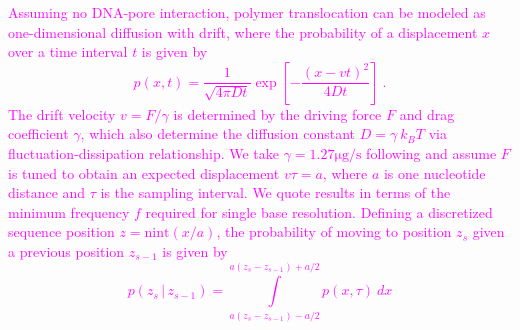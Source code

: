 \documentclass{biophys_letter}
\newcommand{\bias}{\beta}
\newcommand{\jwm}[1]{\textcolor{Magenta}{#1}}
\begin{document}
\begin{multicols}{2}
\jwm{
Assuming no DNA-pore interaction, polymer translocation can be modeled as one-dimensional diffusion with drift, where the probability of a displacement $x$ over a time interval $t$ is given by
\begin{equation}
  p(x, t) 
  =  
  \frac{1}
       {\sqrt{4 \pi D t}}
  \exp 
  \left[ 
    - \frac{(x - v t)^2}
           {4 D t} 
  \right]
  ~.
\end{equation}
The drift velocity $v = F/\gamma$ is determined by the driving force $F$ and drag coefficient $\gamma$, which also determine the diffusion constant $D = \gamma \: k_B T$ via fluctuation-dissipation relationship.
We take $\gamma = 1.27 \mathrm{\mu g/s}$ following \cite{Lu:2011} and assume $F$ is tuned to obtain an expected displacement $v \tau = a$, where $a$ is one nucleotide distance and $\tau$ is the sampling interval.
We quote results in terms of the minimum frequency $f$ required for single base resolution.
Defining a discretized sequence position $z = \mathrm{nint}(x / a)$, the probability of moving to position $z_s$ given a previous position $z_{s-1}$ is given by
\begin{equation}
\label{eq:gaussian_kernel}
p(z_s \,|\, z_{s-1}) 
=
\int\limits_{a (z_s - z_{s-1}) - a/2}^{a (z_s - z_{s-1}) + a/2}
p(x, \tau) \: dx
\end{equation}
}




\end{multicols}
\end{document}
